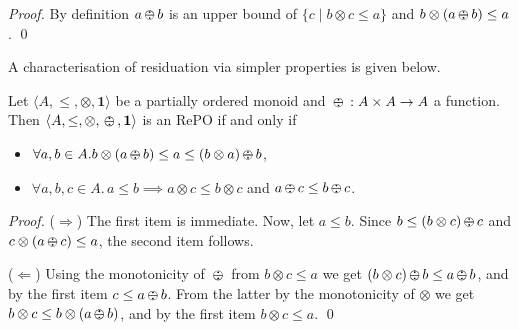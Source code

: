 \documentclass{llncs}
\def\monid{{\mathbf 0}}
\def\monop{\otimes}
\def\odiv{\, {\ominus\hspace{-7.7pt} \div} \,}
\def\monid{\mathbf{1}}
\begin{document}
\begin{proof}
	By definition $a \odiv b$ is an upper bound of 
	$\{ c \mid b \monop c \leq a\}$ and $b \monop (a \odiv b) \leq a$.
\qed
\end{proof}


A characterisation of residuation via simpler properties is given below.
\begin{lemma}
\label{mono}
Let $\langle A, \leq, \monop, \monid \rangle$ be a partially ordered monoid  and
	$\odiv: A \times A \rightarrow A$ a function. Then $\langle A, \leq, \monop, \odiv, \monid \rangle$ is an RePO if and only if
	\begin{itemize}
		\item $\forall a, b \in A. b \monop (a \odiv b) \leq a \leq (b \monop a) \odiv b$,
		\item $\forall a, b, c \in A.\, a \leq b \implies a \otimes c \leq b \otimes c$ and $a\odiv c \leq b \odiv c$.
\end{itemize}
\end{lemma}

\begin{proof} ($\Longrightarrow$)
The first item is immediate. Now, let $a \leq b$. Since $b \leq (b \otimes c) \odiv c$ and 
$c \otimes (a \odiv c) \leq a$, the second item follows.

($\Longleftarrow$)
Using the monotonicity of $\odiv$ from $b \monop c \leq a$ we get
 $(b \monop c) \odiv b \leq a \odiv b$, and by the first item
 $c \leq a \odiv b$.
 From the latter by the monotonicity of $\otimes$ we get
 $b \otimes c \leq b \otimes (a \odiv b)$, and by the first item
 $b \monop c \leq a$.
\qed
\end{proof}
\end{document}
